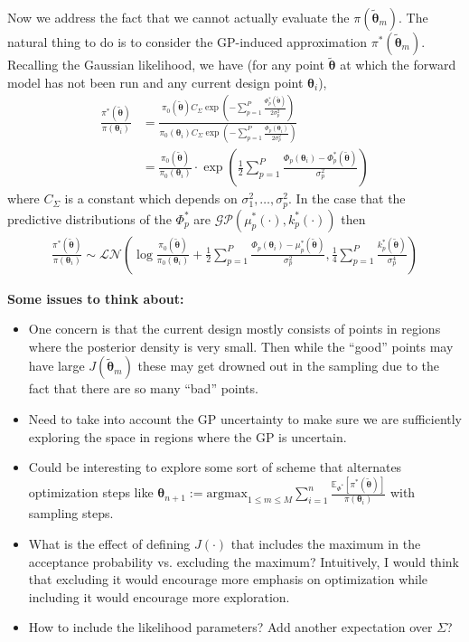 \documentclass[12pt]{article}
\newcommand{\E}{\mathbb{E}}
\newcommand{\btheta}{\boldsymbol{\theta}}
\begin{document}
Now we address the fact that we cannot actually evaluate the $\pi(\tilde{\btheta}_m)$. The natural thing to do is to consider the GP-induced approximation $\pi^*(\tilde{\btheta}_m)$. Recalling the 
Gaussian likelihood, we have (for any point $\tilde{\btheta}$ at which the forward model has not been run and any current design point $\btheta_i$),
\begin{align*}
\frac{\pi^*(\tilde{\btheta})}{\pi(\btheta_i)} &= \frac{\pi_0(\tilde{\btheta}) C_\Sigma \exp\left(-\sum_{p = 1}^{P} \frac{\Phi_p^*(\tilde{\btheta})}{2\sigma_p^2} \right)}{\pi_0(\btheta_i)C_\Sigma \exp\left(- \sum_{p = 1}^{P} \frac{\Phi_p(\btheta_i)}{2\sigma_p^2} \right)} \\
							    &= \frac{\pi_0(\tilde{\btheta})}{\pi_0(\btheta_i)} \cdot \exp\left(\frac{1}{2} \sum_{p = 1}^{P} \frac{\Phi_p(\btheta_i) - \Phi_p^*(\tilde{\btheta})}{\sigma_p^2} \right)
\end{align*}
where $C_\Sigma$ is a constant which depends on $\sigma_1^2, \dots, \sigma_p^2$. In the case that the predictive distributions of the $\Phi^*_p$ are $\mathcal{GP}(\mu^*_p(\cdot), k_p^*(\cdot))$ then 
\begin{align*}
\frac{\pi^*(\tilde{\btheta})}{\pi(\btheta_i)} \sim \mathcal{LN}\left(\log\frac{\pi_0(\tilde{\btheta})}{\pi_0(\btheta_i)} + \frac{1}{2} \sum_{p = 1}^{P} \frac{\Phi_p(\btheta_i) - \mu_p^*(\tilde{\btheta})}{\sigma_p^2}, \frac{1}{4} \sum_{p = 1}^{P} \frac{k_p^*(\tilde{\btheta})}{\sigma_p^4} \right)
\end{align*}

\bigskip
\noindent
\textbf{Some issues to think about:}
\begin{itemize}
\item One concern is that the current design mostly consists of points in regions where the posterior density is very small. Then while the ``good'' points may have large $J(\tilde{\btheta}_m)$ these may get 
drowned out in the sampling due to the fact that there are so many ``bad'' points. 
\item Need to take into account the GP uncertainty to make sure we are sufficiently exploring the space in regions where the GP is uncertain. 
\item Could be interesting to explore some sort of scheme that alternates optimization steps like $\btheta_{n + 1} := \text{argmax}_{1 \leq m \leq M} \sum_{i = 1}^{n} \frac{\E_{\Phi^*}\left[\pi^*(\tilde{\btheta})\right]}{\pi(\btheta_i)}$
with sampling steps. 
\item What is the effect of defining $J(\cdot)$ that includes the maximum in the acceptance probability vs. excluding the maximum? Intuitively, I would think that excluding it would encourage more emphasis on 
optimization while including it would encourage more exploration. 
\item How to include the likelihood parameters? Add another expectation over $\Sigma$? 
\end{itemize}
\end{document}
